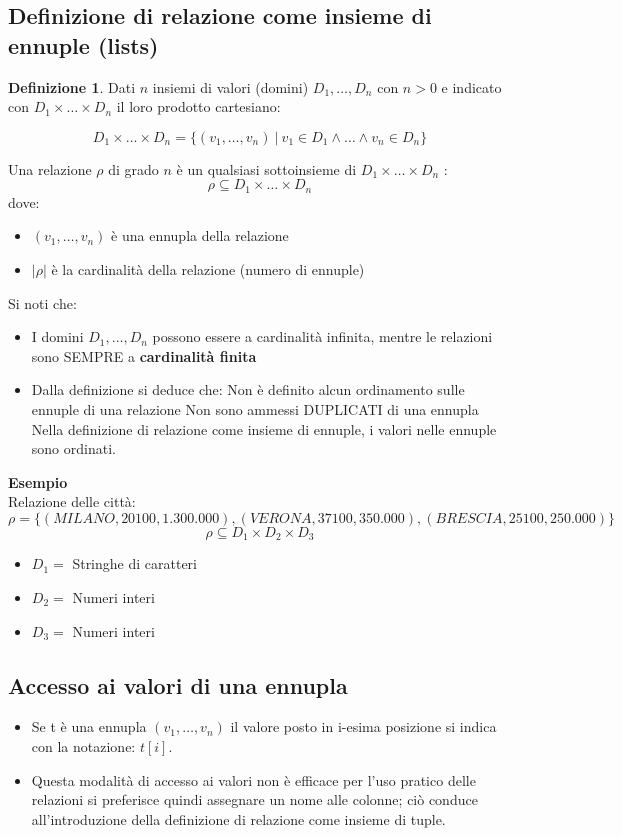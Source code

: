 \documentclass[a4paper, 10pt]{article}
\theoremstyle{definition}
\newtheorem*{defn}{Definizione}
\begin{document}
		\subsection*{Definizione di relazione come insieme di ennuple (lists)}
		\begin{defn}
			Dati $n$ insiemi di valori (domini) $D_1, \dots , D_n$ con $n > 0$ e indicato con $D_1 \times\dots \times D_n$ il loro prodotto cartesiano:
			
			\[
				D_1 \times \dots \times D_n = \{ (v_1, \dots, v_n) \: | \: 
				v_1 \in D_1 \wedge \dots \wedge v_n \in D_n \}
			\]
			
			Una relazione $\rho$ di grado $n$ è un qualsiasi sottoinsieme di 
			$D_1 \times \dots \times D_n$ :
			\[
				\rho \subseteq D_1 \times \dots \times D_n
			\]
			dove:
			\begin{itemize}
				\item $(v_1, \dots, v_n)$ è una ennupla della relazione
				\item $|\rho|$ è la cardinalità della relazione (numero di ennuple)
			\end{itemize}
		\end{defn}
		Si noti che:
		\begin{itemize}
			\item I domini $D_1, \dots , D_n$ possono essere a cardinalità infinita, mentre le relazioni sono SEMPRE a \textbf{cardinalità finita}
			\item Dalla definizione si deduce che:
				\subitem Non è definito alcun ordinamento sulle ennuple di una relazione
				\subitem Non sono ammessi DUPLICATI di una ennupla
				\subitem Nella definizione di relazione come insieme di ennuple, i valori nelle ennuple sono ordinati.
		\end{itemize}
		
		\textbf{Esempio} \\
		Relazione delle città:
		\[
			\rho =\{(MILANO, 20100, 1.300.000),
				(VERONA, 37100, 350.000),
				(BRESCIA, 25100, 250.000) \}
		\]
		\[
			\rho \subseteq D_1 \times D_2 \times D_3
		\]
		\begin{itemize}
			\item $D_1 =$ Stringhe di caratteri
			\item $D_2 =$ Numeri interi
			\item $D_3 =$ Numeri interi
		\end{itemize}
		
		\subsection*{Accesso ai valori di una ennupla}
		\begin{itemize}
			\item Se t è una ennupla $(v_1 , \dots, v_n )$ il valore posto in i-esima
			posizione si indica con la notazione:
			$t[i]$.
			\item Questa modalità di accesso ai valori non è efficace per l'uso
			pratico delle relazioni si preferisce quindi assegnare un nome
			alle colonne; ciò conduce all'introduzione della definizione di
			relazione come insieme di tuple.
		\end{itemize}
		
\end{document}
